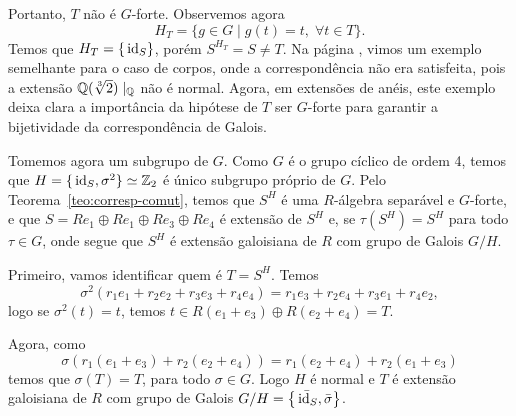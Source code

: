 \begin{exemplo}
Portanto, $T$ não é $G$-forte. Observemos agora \[H_T = \{g \in G \mid g(t) = t, \; \forall t \in T\}.\] Temos que $H_T = \{\, \textrm{id}_{S}\}$, porém $S^{H_T} = S \neq T$. Na página \pageref{ex:correspondencia}, vimos um exemplo semelhante para o caso de corpos, onde a correspondência não era satisfeita, pois a extensão $\mathbb{Q}(\sqrt[3]{2}) \mid_{\mathbb{Q}}$ não é normal. Agora, em extensões de anéis, este exemplo deixa clara a importância da hipótese de $T$ ser $G$-forte para garantir a bijetividade da correspondência de Galois.

Tomemos agora um subgrupo de $G$. Como $G$ é o grupo cíclico de ordem 4, temos que $H = \{\, \textrm{id}_{S}, \sigma^2 \} \simeq \mathbb{Z}_2$ é único subgrupo próprio de $G$. Pelo Teorema~\ref{teo:corresp-comut}, temos que $S^H$ é uma $R$-álgebra separável e $G$-forte, e que $S = Re_1 \oplus R e_1 \oplus R e_3 \oplus R e_4$ é extensão de $S^H$ e, se $\tau(S^H) = S^H$ para todo $\tau \in G$, onde segue que $S^H$ é extensão galoisiana de $R$ com grupo de Galois $G/H$.

Primeiro, vamos identificar quem é $T = S^H$. Temos \[\sigma^2(r_1 e_1 + r_2 e_2 + r_3 e_3 + r_4 e_4) = r_1 e_3 + r_2 e_4 + r_3 e_1 + r_4 e_2,\] logo se $\sigma^2(t) = t$, temos $t \in R(e_1 + e_3) \oplus R(e_2 + e_4) = T$.

Agora, como \[\sigma(r_1(e_1 + e_3) + r_2 (e_2 + e_4)) = r_1 (e_2 + e_4) + r_2 (e_1 + e_3)\] temos que $\sigma(T) = T$, para todo $\sigma \in G$. Logo $H$ é normal e $T$ é extensão galoisiana de $R$ com grupo de Galois $G/H = \left\{\bar{\, \textrm{id}_{S}}, \bar{\sigma} \right\}$.
\end{exemplo}

